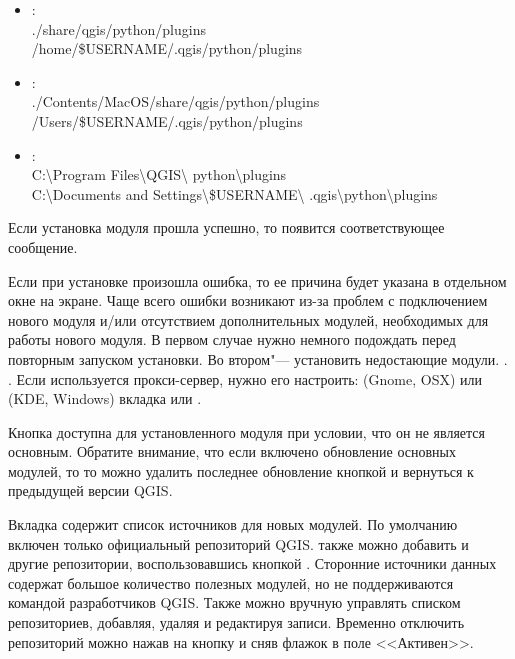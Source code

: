 \begin{itemize}[label=--]
\item {}:\\
./share/qgis/python/plugins \\
/home/\$USERNAME/.qgis/python/plugins
\item {}:\\
./Contents/MacOS/share/qgis/python/plugins \\
/Users/\$USERNAME/.qgis/python/plugins
\item {}:\\
C:\textbackslash Program Files\textbackslash QGIS\textbackslash
python\textbackslash plugins \\
C:\textbackslash Documents and Settings\textbackslash\$USERNAME\textbackslash
.qgis\textbackslash python\textbackslash plugins
\end{itemize}

Если установка модуля прошла успешно, то появится соответствующее
сообщение.

Если при установке произошла ошибка, то ее причина будет указана в
отдельном окне на экране. Чаще всего ошибки возникают из-за проблем с
подключением нового модуля и/или отсутствием дополнительных модулей,
необходимых для работы нового модуля. В первом случае нужно немного
подождать перед повторным запуском установки. Во втором"--- установить
недостающие модули.
.
.
Если используется прокси-сервер, нужно его настроить:
 \arrow {} (Gnome, OSX)
или  \arrow {} (KDE, Windows)
вкладка  или .

Кнопка  доступна для установленного модуля при
условии, что он не является основным. Обратите внимание, что если
включено обновление основных модулей, то то можно удалить последнее
обновление кнопкой   и вернуться к предыдущей
версии QGIS.


Вкладка  содержит список источников для новых модулей.
По умолчанию включен только официальный репозиторий QGIS. также можно
добавить и другие репозитории, воспользовавшись кнопкой
. Сторонние источники данных
содержат большое количество полезных модулей, но не поддерживаются
командой разработчиков QGIS. Также можно вручную управлять списком
репозиториев, добавляя, удаляя и редактируя записи. Временно отключить
репозиторий можно нажав на кнопку  и сняв флажок
в поле <<Активен>>.

